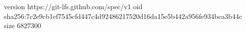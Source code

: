 version https://git-lfs.github.com/spec/v1
oid sha256:7c2e9cb1ef7545cfd447c4d92486217520d16da15e5b442a956fe934bca3b44c
size 6827300
